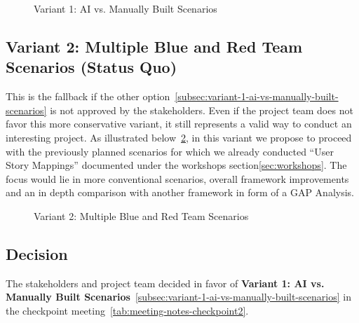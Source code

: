 \begin{figure}
    \centering
    
    \caption{Variant 1: AI vs. Manually Built Scenarios}
    \label{fig:variant-1-ai-vs-manually-built-scenarios}
\end{figure}

\subsection{Variant 2: Multiple Blue and Red Team Scenarios (Status Quo)}\label{subsec:variant-2-multiple-blue-and-red-team-scenarios}

This is the fallback if the other option~\ref{subsec:variant-1-ai-vs-manually-built-scenarios} is not approved by the stakeholders.
Even if the project team does not favor this more conservative variant, it still represents a valid way to conduct an interesting project.
As illustrated below~\ref{fig:variant-2-multiple-blue-and-red-team-scenarios}, in this variant we propose to proceed with the previously planned scenarios for which we already conducted \enquote{User Story Mappings} documented under the workshops section\ref{sec:workshops}.
The focus would lie in more conventional scenarios, overall framework improvements and an in depth comparison with another framework in form of a GAP Analysis.

\begin{figure}
    \centering
    
    \caption{Variant 2: Multiple Blue and Red Team Scenarios}
    \label{fig:variant-2-multiple-blue-and-red-team-scenarios}
\end{figure}

\subsection{Decision}\label{subsec:variant-decision-thesis-goals}

The stakeholders and project team decided in favor of \textbf{Variant 1: AI vs. Manually Built Scenarios}~\ref{subsec:variant-1-ai-vs-manually-built-scenarios} in the checkpoint meeting~\ref{tab:meeting-notes-checkpoint2}.
